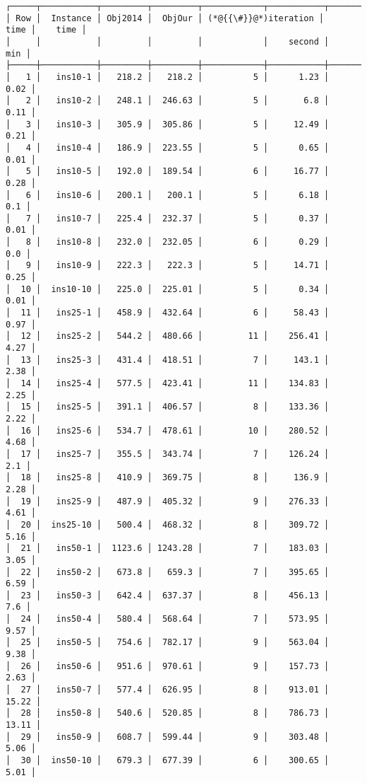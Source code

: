 \documentclass[12pt,a4paper]{article}
\begin{document}
\begin{lstlisting}
┌─────┬───────────┬─────────┬─────────┬────────────┬───────────┬─────────┐
│ Row │  Instance │ Obj2014 │  ObjOur │ (*@{{\#}}@*)iteration │      time │    time │
│     │           │         │         │            │    second │     min │
├─────┼───────────┼─────────┼─────────┼────────────┼───────────┼─────────┤
│   1 │   ins10-1 │   218.2 │   218.2 │          5 │      1.23 │    0.02 │
│   2 │   ins10-2 │   248.1 │  246.63 │          5 │       6.8 │    0.11 │
│   3 │   ins10-3 │   305.9 │  305.86 │          5 │     12.49 │    0.21 │
│   4 │   ins10-4 │   186.9 │  223.55 │          5 │      0.65 │    0.01 │
│   5 │   ins10-5 │   192.0 │  189.54 │          6 │     16.77 │    0.28 │
│   6 │   ins10-6 │   200.1 │   200.1 │          5 │      6.18 │     0.1 │
│   7 │   ins10-7 │   225.4 │  232.37 │          5 │      0.37 │    0.01 │
│   8 │   ins10-8 │   232.0 │  232.05 │          6 │      0.29 │     0.0 │
│   9 │   ins10-9 │   222.3 │   222.3 │          5 │     14.71 │    0.25 │
│  10 │  ins10-10 │   225.0 │  225.01 │          5 │      0.34 │    0.01 │
│  11 │   ins25-1 │   458.9 │  432.64 │          6 │     58.43 │    0.97 │
│  12 │   ins25-2 │   544.2 │  480.66 │         11 │    256.41 │    4.27 │
│  13 │   ins25-3 │   431.4 │  418.51 │          7 │     143.1 │    2.38 │
│  14 │   ins25-4 │   577.5 │  423.41 │         11 │    134.83 │    2.25 │
│  15 │   ins25-5 │   391.1 │  406.57 │          8 │    133.36 │    2.22 │
│  16 │   ins25-6 │   534.7 │  478.61 │         10 │    280.52 │    4.68 │
│  17 │   ins25-7 │   355.5 │  343.74 │          7 │    126.24 │     2.1 │
│  18 │   ins25-8 │   410.9 │  369.75 │          8 │     136.9 │    2.28 │
│  19 │   ins25-9 │   487.9 │  405.32 │          9 │    276.33 │    4.61 │
│  20 │  ins25-10 │   500.4 │  468.32 │          8 │    309.72 │    5.16 │
│  21 │   ins50-1 │  1123.6 │ 1243.28 │          7 │    183.03 │    3.05 │
│  22 │   ins50-2 │   673.8 │   659.3 │          7 │    395.65 │    6.59 │
│  23 │   ins50-3 │   642.4 │  637.37 │          8 │    456.13 │     7.6 │
│  24 │   ins50-4 │   580.4 │  568.64 │          7 │    573.95 │    9.57 │
│  25 │   ins50-5 │   754.6 │  782.17 │          9 │    563.04 │    9.38 │
│  26 │   ins50-6 │   951.6 │  970.61 │          9 │    157.73 │    2.63 │
│  27 │   ins50-7 │   577.4 │  626.95 │          8 │    913.01 │   15.22 │
│  28 │   ins50-8 │   540.6 │  520.85 │          8 │    786.73 │   13.11 │
│  29 │   ins50-9 │   608.7 │  599.44 │          9 │    303.48 │    5.06 │
│  30 │  ins50-10 │   679.3 │  677.39 │          6 │    300.65 │    5.01 │

\end{lstlisting}
\end{document}
